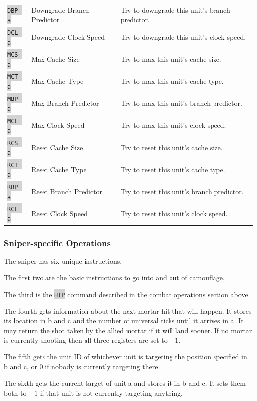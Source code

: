 \documentclass{article}
\newcommand{\vnscode}[1]{\colorbox{lightgray}{\lstinline[language=vns]{#1}}}
\begin{document}
\begin{minipage}{\textwidth}
\begin{tabular}{lll}
    \vnscode{DBP a} & Downgrade Branch Predictor & Try to downgrade this unit's branch predictor. \\
    \vnscode{DCL a} & Downgrade Clock Speed & Try to downgrade this unit's clock speed. \\
    \vnscode{MCS a} & Max Cache Size & Try to max this unit's cache size. \\
    \vnscode{MCT a} & Max Cache Type & Try to max this unit's cache type. \\
    \vnscode{MBP a} & Max Branch Predictor & Try to max this unit's branch predictor. \\
    \vnscode{MCL a} & Max Clock Speed & Try to max this unit's clock speed. \\
    \vnscode{RCS a} & Reset Cache Size & Try to reset this unit's cache size. \\
    \vnscode{RCT a} & Reset Cache Type & Try to reset this unit's cache type. \\
    \vnscode{RBP a} & Reset Branch Predictor & Try to reset this unit's branch predictor. \\
    \vnscode{RCL a} & Reset Clock Speed & Try to reset this unit's clock speed. \\
\end{tabular}
\end{minipage}

\subsubsection{Sniper-specific Operations}

The sniper has six unique instructions.

The first two are the basic instructions to go into and out of camouflage.

The third is the \vnscode{HIP} command described in the combat operations
section above.

The fourth gets information about the next mortar hit that will happen. It
stores its location in b and c and the number of universal ticks until it
arrives in a. It may return the shot taken by the allied mortar if it will land
sooner. If no mortar is currently shooting then all three registers are set to
$-1$.

The fifth gets the unit ID of whichever unit is targeting the position specified
in b and c, or 0 if nobody is currently targeting there.

The sixth gets the current target of unit a and stores it in b and c. It sets
them both to $-1$ if that unit is not currently targeting anything.
\end{document}
